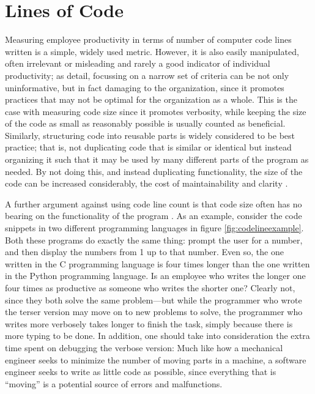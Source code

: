 \documentclass[letterpaper, 12pt]{report}
\begin{document}
\section{Lines of Code}
Measuring employee productivity in terms of number of computer code lines written is a simple, widely used metric. 
However, it is also easily manipulated, often irrelevant or misleading and rarely a good indicator of individual productivity; as \textcite[][353, 374]{textbook} detail, focussing on a narrow set of criteria can be not only uninformative, but in fact damaging to the organization, since it promotes practices that may not be optimal for the organization as a whole. 
This is the case with measuring code size since it promotes verbosity, while keeping the size of the code as small as reasonably possible is usually counted as beneficial. 
Similarly, structuring code into reusable parts is widely considered to be best practice; that is, not duplicating code that is similar or identical but instead organizing it such that it may be used by many different parts of the program as needed. 
By not doing this, and instead duplicating functionality, the size of the code can be increased considerably, the cost of maintainability and clarity \parencite{veksler:truths}.

A further argument against using code line count is that code size often has no bearing on the functionality of the program \parencite{albrechtgaffey:linesofcode}. 
As an example, consider the code snippets in two different programming languages in figure \ref{fig:codelineexample}. 
Both these programs do exactly the same thing: prompt the user for a number, and then display the numbers from 1 up to that number. 
Even so, the one written in the C programming language is four times longer than the one written in the Python programming language. 
Is an employee who writes the longer one four times as productive as someone who writes the shorter one? 
Clearly not, since they both solve the same problem---but while the programmer who wrote the terser version may move on to new problems to solve, the programmer who writes more verbosely takes longer to finish the task, simply because there is more typing to be done. 
In addition, one should take into consideration the extra time spent on debugging the verbose version: 
Much like how a mechanical engineer seeks to minimize the number of moving parts in a machine, a software engineer seeks to write as little code as possible, since everything that is ``moving'' is a potential source of errors and malfunctions. 
\end{document}
